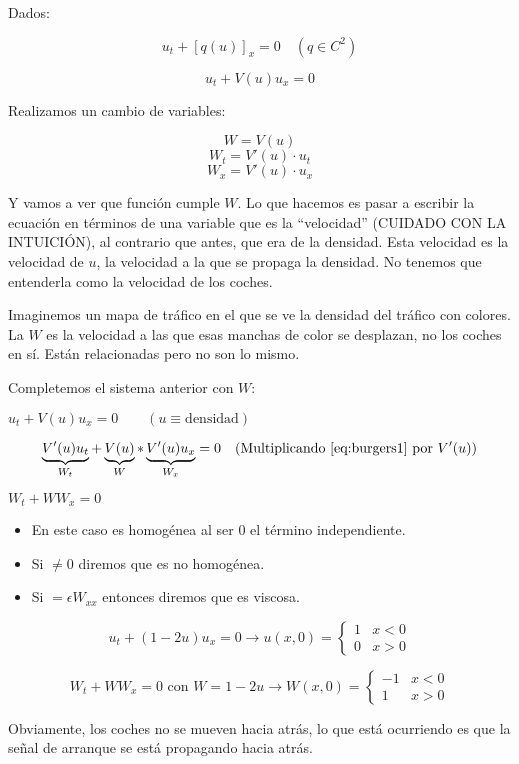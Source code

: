 		Dados:

		$$ u_t + [q(u)]_x = 0 \quad (q \in C^2) $$

		$$u_t + V(u)u_x = 0 $$

		Realizamos un cambio de variables:

		$$W = V(u)$$
		$$W_t = V'(u) \cdot u_t$$
		$$W_x = V'(u) \cdot u_x$$

		Y vamos a ver que función cumple $W$. Lo que hacemos es pasar a escribir la ecuación en términos de una variable que es la ``velocidad'' (CUIDADO CON LA INTUICIÓN), al contrario que antes, que era de la densidad. Esta velocidad es la velocidad de $u$, la velocidad a la que se propaga la densidad. No tenemos que entenderla como la velocidad de los coches.

		Imaginemos un mapa de tráfico en el que se ve la densidad del tráfico con colores. La $W$ es la velocidad a las que esas manchas de color se desplazan, no los coches en sí. Están relacionadas pero no son lo mismo.

		Completemos el sistema anterior con $W$:

		\(u_t + V(u) u_x = 0\quad\quad (u \equiv \text{densidad}) \label{eq:burgers1}\)

		$$\underbrace{V'(u) u_t}_{W_t} + \underbrace{V(u)}_{W} * \underbrace{V'(u) u_x}_{W_x} = 0 \quad (\text{Multiplicando \ref{eq:burgers1} por }V'(u))$$

		\( W_t + WW_x = 0 \label{eq:Ecuación de Burgers} \)



		\begin{itemize}
			\item En este caso es homogénea al ser $0$ el término independiente.
			\item Si $\neq 0$ diremos que es no homogénea.
			\item Si $ = \epsilon W_{xx}$ entonces diremos que es viscosa.
		\end{itemize}

		\begin{example}
			\[u_t + (1-2u) u_x = 0
			\rightarrow u(x,0) =
			\begin{cases}
				1 & x < 0 \\
				0 & x > 0
			\end{cases}
			\]

			\[W_t + W W_x = 0 \text{ con } W = 1 - 2u
			\rightarrow W(x,0) =
			\begin{cases}
				-1 & x < 0 \\
				1 & x > 0
			\end{cases}
			\]

			Obviamente, los coches no se mueven hacia atrás, lo que está ocurriendo es que la señal de arranque se está propagando hacia atrás.

		\end{example}


